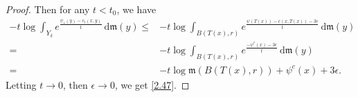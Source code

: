\documentclass[a4paper,11pt]{article}
\numberwithin{equation}{section}
\theoremstyle{plain}
\theoremstyle{definition}
\theoremstyle{remark}
\newcommand{\mm}{\mathfrak m}
\renewcommand{\d}{{\mathrm d}}
\begin{document}
\begin{proof}
		Then for any $t<t_0$, we have
		\begin{equation}\label{2.48}
			\begin{aligned}
				-t\log\int_{Y_\delta} e^{\frac{\psi_*(y)-c_t(x,y)}{t}}\,\d\mm(y)
				\leq &-t\log\int_{B(T(x),r)} e^{\frac{\psi(T(x))-c(x,T(x))-3\epsilon}{t}}\,\d\mm(y)\\
				= &-t\log\int_{B(T(x),r)} e^{\frac{-\psi^c(x)-3\epsilon}{t}}\,\d\mm(y)\\
				=&-t\log\mm(B(T(x),r))+\psi^c(x)+3\epsilon.
			\end{aligned}
		\end{equation}
		Letting $t\rightarrow0$, then $\epsilon\rightarrow0$, we get \eqref{2.47}.
		
		
	\end{proof}
	
	
\end{document}
